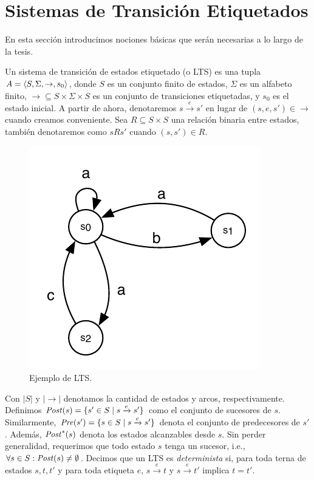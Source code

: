 \section{Sistemas de Transición Etiquetados}

En esta sección introducimos nociones básicas que serán necesarias a lo largo de la tesis.

Un sistema de transición de estados etiquetado (o LTS) es una tupla $A =\langle S, \Sigma, \rightarrow, s_0 \rangle$, donde $S$ es un conjunto finito de estados, $\Sigma$ es un alfabeto finito,  $\rightarrow \subseteq S \times \Sigma \times S$ es un conjunto de transiciones etiquetadas, y $s_0$ es el estado inicial. A partir de ahora, denotaremos $s \xrightarrow{e} s'$ en lugar de $(s,e,s') \in \rightarrow$ cuando creamos conveniente. Sea $R \subseteq S \times S$ una relación binaria entre estados, también denotaremos como $sRs'$ cuando $(s,s') \in R$.
\begin{figure}[ht] 
\begin{center}
    \includegraphics[scale=0.75]{Figs/examplesThesisLTS.pdf} 
    \caption{Ejemplo de LTS.}
    \label{figure:lts1}
\end{center}
\end{figure}
Con $|S|$ y $|{\rightarrow}|$ denotamos la cantidad de estados y arcos, respectivamente. Definimos $\mathit{Post}(s) = \{s' \in S \mid s \xrightarrow{e} s' \}$ como el conjunto de sucesores de $s$. Similarmente,  $\mathit{Pre}(s') = \{s \in S \mid s \xrightarrow{e} s' \}$ denota el conjunto de predecesores de $s'$.
Además, $\mathit{Post}^{*}(s)$ denota los estados alcanzables desde $s$.
Sin perder generalidad, requerimos que todo estado $s$ tenga un sucesor, i.e., $\forall s \in S : \mathit{Post}(s) \neq \emptyset$. Decimos que un LTS es \emph{determinista} si, para toda terna de estados  $s,t, t'$ y para toda etiqueta $e$, $s \xrightarrow{e} t$ y $s \xrightarrow{e} t'$ implica $t=t'$. 

